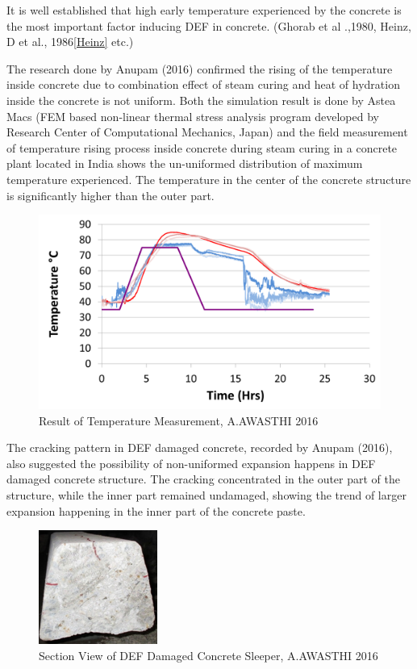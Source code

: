 It is well established that high early temperature experienced by the concrete is the most important factor inducing DEF in concrete. (Ghorab et al .,1980\cite{Ghorab}, Heinz, D et al., 1986\ref{Heinz} etc.)

The research done by Anupam (2016)\cite{Awasthi} confirmed the rising of the temperature inside concrete due to combination effect of steam curing and heat of hydration inside the concrete is not uniform. Both the simulation result is done by Astea Macs (FEM based non-linear thermal stress analysis program developed by Research Center of Computational Mechanics, Japan) and the field measurement of temperature rising process inside concrete during steam curing in a concrete plant located in India shows the un-uniformed distribution of maximum temperature experienced. The temperature in the center of the concrete structure is significantly higher than the outer part.

\begin{figure}[ht!]
\centering
\includegraphics[width=.6\linewidth]{Files/Background/Anupam_2.png}
  \caption{Result of Temperature Measurement, A.AWASTHI 2016}
  \label{fig:temp_measurement}
\end{figure}


The cracking pattern in DEF damaged concrete, recorded by Anupam (2016)\cite{Awasthi}, also suggested the possibility of non-uniformed expansion happens in DEF damaged concrete structure. The cracking concentrated in the outer part of the structure, while the inner part remained undamaged, showing the trend of larger expansion happening in the inner part of the concrete paste.

\begin{figure}[ht!]
\centering
\includegraphics[width=.4\linewidth]{Files/Background/Anupam_5.png}
  \caption{Section View of DEF Damaged Concrete Sleeper, A.AWASTHI 2016}
  \label{fig:section_view}
\end{figure}

